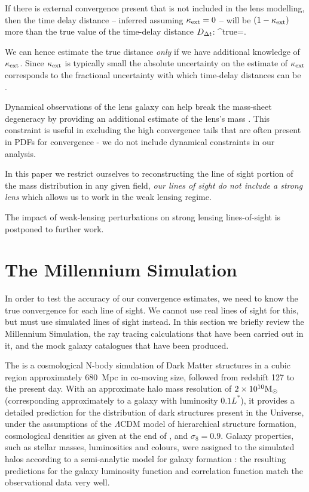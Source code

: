 \documentclass[useAMS,usenatbib,a4paper]{mn2e}
\begin{document}
If there is external convergence present that is not included in the
lens modelling, then the time delay distance -- inferred assuming $\kappa_{\rm ext}
= 0$ -- will be $(1-\kappa_{\rm ext})$ more than the true value of the time-delay distance $D_{\Delta t}$:
\be 
\label{eq:MassSheet:Dtbias}
\Dt^{\rm{true}}=.
\ee

We can hence estimate the true distance {\it only} if we have additional
knowledge of $\kappa_{\rm ext}$. Since $\kappa_{\rm ext}$ is typically small the absolute
uncertainty on the estimate of $\kappa_{\rm ext}$ corresponds to the fractional
uncertainty with which time-delay distances can be \infered.

Dynamical observations of the lens galaxy
can help break the mass-sheet degeneracy by providing an additional
estimate of the lens's mass
\citep[e.g.,][]{KoopmansEtal2003,Koopmans2004,SuyuEtal2010}. This constraint 
is useful in excluding the high convergence tails that are often present in 
PDFs for convergence - we do not include dynamical constraints in our analysis. 

In this paper we restrict ourselves to reconstructing
the line of sight portion of the mass distribution in any given field, {\it our lines of sight do not include a strong lens} which allows us to work in the weak lensing regime.  


The impact of weak-lensing perturbations on strong lensing lines-of-sight is
postponed to further work.


\section{The Millennium Simulation}
\label{sec:MS}

In order to test the accuracy of our convergence estimates, we need to
know the true convergence for each line of sight. We cannot use  real
lines of sight for this,  but must use simulated lines of sight instead.
In this section we briefly review the Millennium Simulation, the ray
tracing calculations that have been carried out in it, and the mock
galaxy catalogues that have been produced.

The \MS \citep{SpringelEtal2005} is a cosmological N-body simulation of
Dark Matter structures in a cubic region approximately 680~Mpc in
co-moving size, followed from redshift 127 to the present day. With an
approximate halo mass resolution of $2\times10^{10}{\rm M}_{\odot}$
(corresponding approximately to a galaxy with luminosity $0.1L^{*}$), it
provides a detailed prediction for the distribution of dark structures
present in the Universe, under the assumptions of the $\Lambda$CDM model
of hierarchical structure formation, cosmological densities as given at
the end of , and $\sigma_8 = 0.9$.
Galaxy properties,
such as stellar masses, luminosities and colours, were assigned to the
simulated halos according to a semi-analytic model for galaxy formation
\citep{DeLucia+Blaizot2007}: the resulting predictions for the galaxy
luminosity function and correlation function match the observational
data very well.
\end{document}
